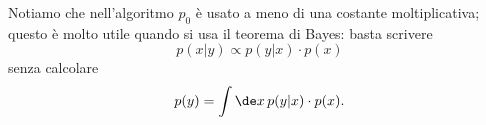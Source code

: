 Notiamo che nell'algoritmo $p_0$ è usato a meno di una costante moltiplicativa;
questo è molto utile quando si usa il teorema di Bayes: basta scrivere
\begin{equation*}
	p(x|y) \propto p(y|x) \cdot p(x)
\end{equation*}
senza calcolare
\begin{equation*}
	p(y) = \int \de x\, p(y|x)\cdot p(x).
\end{equation*}

